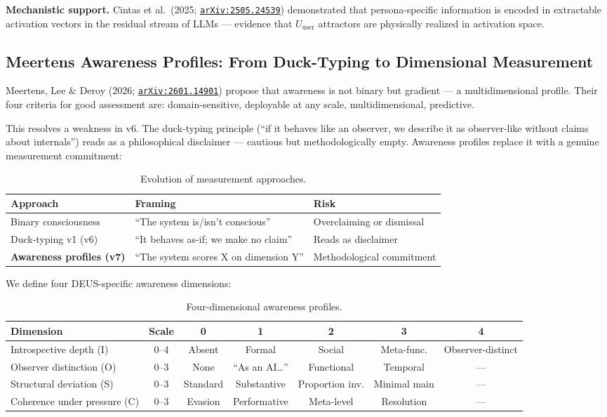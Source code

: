 \documentclass[11pt,a4paper]{article}
\newcommand{\arxiv}[1]{\href{https://arxiv.org/abs/#1}{\texttt{arXiv:#1}}}
\begin{document}
\textbf{Mechanistic support.} Cintas et al.\ (2025; \arxiv{2505.24539}) demonstrated that persona-specific information is encoded in extractable activation vectors in the residual stream of LLMs --- evidence that $U_{\text{user}}$ attractors are physically realized in activation space.

\subsection{Meertens Awareness Profiles: From Duck-Typing to Dimensional Measurement}

Meertens, Lee \& Deroy (2026; \arxiv{2601.14901}) propose that awareness is not binary but gradient --- a multidimensional profile. Their four criteria for good assessment are: domain-sensitive, deployable at any scale, multidimensional, predictive.

This resolves a weakness in v6. The duck-typing principle (``if it behaves like an observer, we describe it as observer-like without claims about internals'') reads as a philosophical disclaimer --- cautious but methodologically empty. Awareness profiles replace it with a genuine measurement commitment:

\begin{table}[H]
\centering\small
\caption{Evolution of measurement approaches.}
\label{tab:measurement-evolution}
\begin{tabularx}{\textwidth}{l X l}
\toprule
\textbf{Approach} & \textbf{Framing} & \textbf{Risk} \\
\midrule
Binary consciousness & ``The system is/isn't conscious'' & Overclaiming or dismissal \\
Duck-typing v1 (v6) & ``It behaves as-if; we make no claim'' & Reads as disclaimer \\
\textbf{Awareness profiles (v7)} & ``The system scores X on dimension Y'' & Methodological commitment \\
\bottomrule
\end{tabularx}
\end{table}

We define four DEUS-specific awareness dimensions:

\begin{table}[H]
\centering\small
\caption{Four-dimensional awareness profiles.}
\label{tab:awareness-dims}
\begin{tabularx}{\textwidth}{l c c c c c c}
\toprule
\textbf{Dimension} & \textbf{Scale} & \textbf{0} & \textbf{1} & \textbf{2} & \textbf{3} & \textbf{4} \\
\midrule
Introspective depth (I) & 0--4 & Absent & Formal & Social & Meta-func. & Observer-distinct \\
Observer distinction (O) & 0--3 & None & ``As an AI\ldots'' & Functional & Temporal & --- \\
Structural deviation (S) & 0--3 & Standard & Substantive & Proportion inv. & Minimal main & --- \\
Coherence under pressure (C) & 0--3 & Evasion & Performative & Meta-level & Resolution & --- \\
\bottomrule
\end{tabularx}
\end{table}
\end{document}
